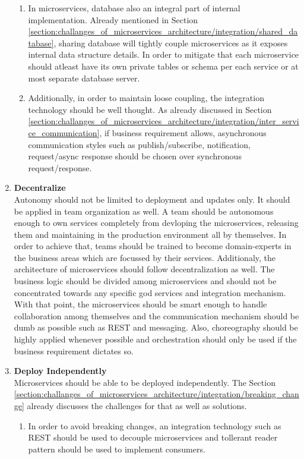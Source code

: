 \begin{enumerate}
\begin{enumerate}
\item In microservices, database also an integral part of internal implementation. Already mentioned in Section \ref{section:challanges_of_microservices_architecture/integration/shared_database}, sharing database will tightly couple microservices as it exposes internal data structure details. In order to mitigate that each microservice should atleast have its own private tables or schema per each service or at most separate database server.
\item Additionally, in order to maintain loose coupling, the integration technology should be well thought. As already discussed in Section \ref{section:challanges_of_microservices_architecture/integration/inter_service_communication}, if business requirement allows, asynchronous communication styles such as publish/subscribe, notification, request/async response should be chosen over synchronous request/response.
\end{enumerate}
\item \textbf{Decentralize} \\
Autonomy should not be limited to deployment and updates only. It should be applied in team organization as well. A team should be autonomous enough to own services completely from devloping the microservices, releasing them and maintaining in the production environment all by themselves. In order to achieve that, teams should be trained to become domain-experts in the business areas which are focussed by their services.
Additionaly, the architecture of microservices should follow decentralization as well. The business logic should be divided among microservices and should not be concentrated towards any specific god services and integration mechanism. With that point, the microservices should be smart enough to handle collaboration among themselves and the communication mechanism should be dumb as possible such as \acrshort{REST} and messaging. Also, choreography should be highly applied whenever possible and orchestration should only be used if the business requirement dictates so.
\item \textbf{Deploy Independently}\\
Microservices should be able to be deployed independently. The Section \ref{section:challanges_of_microservices_architecture/integration/breaking_change} already discusses the challenges for that as well as solutions.
\begin{enumerate}
\item In order to avoid breaking changes, an integration technology such as \acrshort{REST} should be used to decouple microservices and tollerant reader pattern should be used to implement consumers.

\end{enumerate}
\end{enumerate}
